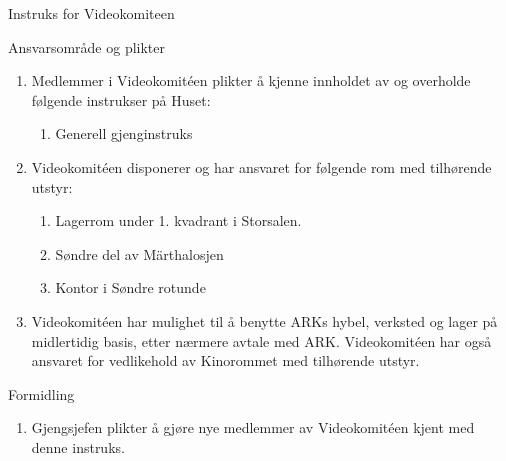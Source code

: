\documentclass[../fsbok.tex]{subfiles}
\begin{document}
\begin{instruks*}{Instruks for Videokomiteen}
     \begin{instruksledd}{Ansvarsområde og plikter}
        \begin{enumerate}
           \item Medlemmer i Videokomit\'een plikter å kjenne innholdet av og overholde følgende
                instrukser på Huset:
                \begin{enumerate} 
                    \item Generell gjenginstruks
                \end{enumerate}
            \item Videokomit\'een disponerer og har ansvaret for følgende rom med tilhørende utstyr:
                \begin{enumerate}
                    \item Lagerrom under 1. kvadrant i Storsalen.
                    \item Søndre del av Märthalosjen
                    \item Kontor i Søndre rotunde
                \end{enumerate}
            \item Videokomit\'een har mulighet til å benytte ARKs hybel, verksted og lager på midlertidig
            basis, etter nærmere
            avtale med ARK. Videokomit\'een har også ansvaret for vedlikehold av Kinorommet med
            tilhørende utstyr.
        \end{enumerate}
    \end{instruksledd}

    \begin{instruksledd}{Formidling}
        \begin{enumerate}
            \item Gjengsjefen plikter å gjøre nye medlemmer av Videokomit\'een kjent med
                denne instruks.
        \end{enumerate}
    \end{instruksledd}


\end{instruks*}
\end{document}

